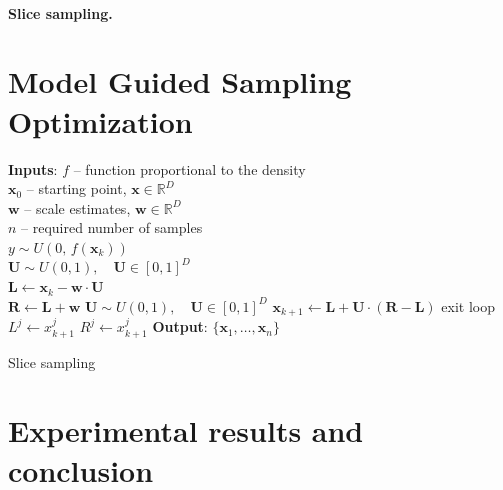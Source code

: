 \documentclass{itatnew}
\newcommand{\xx}{\mathrm{\mathbf{x}}}
\begin{document}
\paragraph{Slice sampling.}

\section{Model Guided Sampling Optimization}
\label{sec:mgso}


\begin{algorithm}
\begin{algorithmic}[1]
\STATE \textbf{Inputs}: $f$ -- function proportional to the density \\
  \quad $\xx_0$ -- starting point, $\xx \in \mathbb{R}^D$ \\
  \quad $\mathbf{w}$ -- scale estimates, $\mathbf{w} \in \mathbb{R}^D$ \\
  \quad $n$ -- required number of samples
  \STATE {} \\
      $y \sim U(0, \, f(\xx_k))$
  \STATE {} \\
      $\mathbf{U} \sim U(0,1), \quad \mathbf{U} \in [0,1]^D$ \\
      $\mathbf{L} \leftarrow \xx_k - \mathbf{w} \cdot \mathbf{U}$ \\
      $\mathbf{R} \leftarrow \mathbf{L} + \mathbf{w}$
  \STATE {}
    \STATE $\mathbf{U} \sim U(0,1), \quad \mathbf{U} \in [0,1]^D$
    \STATE $\xx_{k+1} \leftarrow \mathbf{L} + \mathbf{U} \cdot (\mathbf{R} - \mathbf{L})$
    \IF {$(y < f(\xx_{k+1}))$}
      \STATE exit loop
    \ENDIF
        \STATE $L^j \leftarrow x^j_{k+1}$
      \ELSE
        \STATE $R^j \leftarrow x^j_{k+1}$
      \ENDIF
    \ENDFOR
  \ENDWHILE
\ENDFOR
\STATE \textbf{Output}: $\{\xx_1,\ldots,\xx_n\}$
\end{algorithmic}
\caption{Slice sampling~\cite{neal_slice_2003}}
\label{alg:slice}
\end{algorithm}


\section{Experimental results and conclusion}
\label{sec:results}
\end{document}
